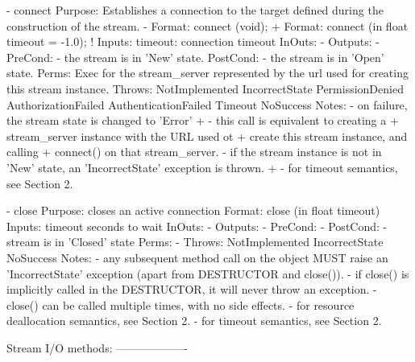\begin{myspec}
    - connect
      Purpose:  Establishes a connection to the target defined
                during the construction of the stream.
-     Format:   connect              (void);
+     Format:   connect              (in float timeout = -1.0);
!     Inputs:   timeout:              connection timeout
      InOuts:   -
      Outputs:  -
      PreCond:  - the stream is in 'New' state.
      PostCond: - the stream is in 'Open' state.
      Perms:    Exec for the stream_server represented by the
                url used for creating this stream instance.
      Throws:   NotImplemented
                IncorrectState
                PermissionDenied
                AuthorizationFailed
                AuthenticationFailed
                Timeout
                NoSuccess
      Notes:    - on failure, the stream state is changed to
                  'Error'
+               - this call is equivalent to creating a
+                 stream_server instance with the URL used ot
+                 create this stream instance, and calling
+                 connect() on that stream_server.
                - if the stream instance is not in 'New' state,
                  an 'IncorrectState' exception is thrown.
+               - for timeout semantics, see Section 2.
 
 
    - close
      Purpose:  closes an active connection
      Format:   close                (in float timeout)
      Inputs:   timeout               seconds to wait
      InOuts:   -
      Outputs:  -
      PreCond:  -
      PostCond: - stream is in 'Closed' state
      Perms:    -
      Throws:   NotImplemented
                IncorrectState
                NoSuccess
      Notes:    - any subsequent method call on the object
                  MUST raise an 'IncorrectState' exception
                  (apart from DESTRUCTOR and close()).
                - if close() is implicitly called in the
                  DESTRUCTOR, it will never throw an exception.
                - close() can be called multiple times, with no
                  side effects.
                - for resource deallocation semantics, see 
                  Section 2.
                - for timeout semantics, see Section 2.
 
 
    Stream I/O methods:
    -------------------
 

\end{myspec}
